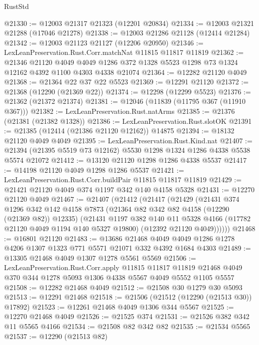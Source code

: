 \begin{lexlean}{RustStd}
\begin{coremodule}
@21330 := @12003 @21317 @21323 (@12201 @20834)
@21334 := @12003 @21321 @21288 (@17046 @21278)
@21338 := @12003 @21286 @21128 (@12414 @21284)
@21342 := @12003 @21123 @21127 (@12206 @20950)
@21346 := LexLeanPreservation.Rust.Corr.matchNat @11815 @11817 @11819
@21362 := @21346
    @21120
    @4049
    @4049
    @1286
    @372
    @1328
    @5523
    @1298
    @73
    @1324
    @12162
    @4392
    @1100
    @4303
    @4338
    @21074
@21364 := @12282 @21120 @4049
@21368 := @21364 @22 @37 @22 @5523
@21369 := @12291 @21120
@21372 := @21368 (@12290 (@21369 @22))
@21374 := @12298 (@12299 @5523)
@21376 := @21362 (@21372 @21374)
@21381 := @12046 (@11839 (@11795 @367 (@11910 @367)))
@21382 := LexLeanPreservation.Rust.natArms
@21385 := @21376 (@21381 (@21382 @1328))
@21386 := LexLeanPreservation.Rust.slotOK
@21391 := @21385 (@12414 (@21386 @21120 @12162)) @14875
@21394 := @18132 @21120 @4049 @4049
@21395 := LexLeanPreservation.Rust.Kind.nat
@21407 := @21394 (@21395 @5519 @73 @12162) @5530 @1298 @1324 @1286 @4338 @5538 @5574 @21072
@21412 := @13120 @21120 @1298 @1286 @4338 @5537
@21417 := @14198 @21120 @4049 @1298 @1286 @5537
@21421 := LexLeanPreservation.Rust.Corr.buildPair @11815 @11817 @11819
@21429 := @21421 @21120 @4049 @374 @1197 @342 @140 @4158 @5328
@21431 := @12270 @21120 @4049
@21467 := @21407
    (@21412
      (@21417
        (@21429
          (@21431
            @374
            @1296
            @342
            @142
            @4158
            @7873
            (@21364 @82 @342 @82 @4158 (@12290 (@21369 @82)) @12335)
            (@21431
              @1197
              @382
              @140
              @11
              @5328
              @4166
              (@17782 @21120 @4049 @1194 @140 @5327 @19800)
              (@12392 @21120 @4049))))))
@21468 := @16801 @21120
@21483 := @13686
    @21468
    @4049
    @4049
    @1286
    @1278
    @4206
    @1307
    @1323
    @771
    @5571
    @21071
    @332
    @4392
    @1684
    @4303
@21489 := @13305 @21468 @4049 @1307 @1278 @5561 @5569
@21506 := LexLeanPreservation.Rust.Corr.apply
    @11815
    @11817
    @11819
    @21468
    @4049
    @370
    @344
    @1278
    @5093
    @1306
    @4338
    @5567
    @4049
    @5552
    @1105
    @5557
@21508 := @12282 @21468 @4049
@21512 := @21508 @30 @1279 @30 @5093
@21513 := @12291 @21468
@21518 := @21506 (@21512 (@12290 (@21513 @30)) @17892)
@21523 := @12261 @21468 @4049 @1306 @344 @5567
@21525 := @12270 @21468 @4049
@21526 := @21525 @374
@21531 := @21526 @382 @342 @11 @5565 @4166
@21534 := @21508 @82 @342 @82
@21535 := @21534 @5565
@21537 := @12290 (@21513 @82)

\end{coremodule}
\end{lexlean}
